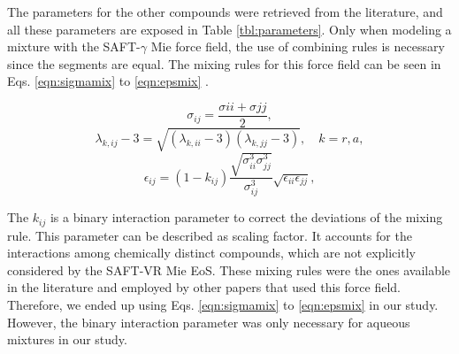 \documentclass[final,12p,times,twocolumn]{elsarticle}
\begin{document}
	The parameters for the other compounds were retrieved from the literature, and all these parameters are exposed in Table \ref{tbl:parameters}. Only when modeling a mixture with the SAFT-$\gamma$ Mie force field, the use of combining rules is necessary since the segments are equal. The mixing rules for this force field can be seen in Eqs. \ref{eqn:sigmamix} to \ref{eqn:epsmix} \cite{lafitte2013}.
	
	\begin{equation}
	\sigma_{ij} =\frac{\sigma{ii}+\sigma{jj}}{2},
	\label{eqn:sigmamix}
	\end{equation}
	\begin{equation}
	\lambda_{k,ij} -3 =\sqrt{(\lambda_{k,ii}-3)(\lambda_{k,jj}-3)}, \quad k=r,a,
	\label{eqn:lambdamix}
	\end{equation}
	\begin{equation}
	\label{eqn:epsmix}
	\epsilon_{ij} =(1-k_{ij})\frac{\sqrt{\sigma_{ii}^{3}\sigma_{jj}^{3}}}{\sigma_{ij}^{3}}\sqrt{\epsilon_{ii}\epsilon_{jj}},
	\end{equation}
	
	The $k_{ij}$ is a binary interaction parameter to correct the deviations of the mixing rule. This parameter can be described as scaling factor. It accounts for the interactions among chemically distinct compounds, which are not explicitly considered by the SAFT-VR Mie EoS. These mixing rules were the ones available in the literature and employed by other papers that used this force field. Therefore, we ended up using Eqs. \ref{eqn:sigmamix} to \ref{eqn:epsmix} in our study. However, the binary interaction parameter was only necessary for aqueous mixtures in our study.   
	
\end{document}
